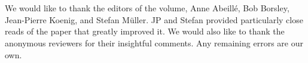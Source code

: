\section*{\acknowledgmentsUS}

We would like to thank the editors of the volume, Anne Abeillé, Bob Borsley, Jean-Pierre Koenig, and Stefan Müller. JP and Stefan provided particularly close reads of the paper that greatly improved it. We would also like to thank the anonymous reviewers for their insightful comments. Any remaining errors are our own. 

{\sloppy
\printbibliography[heading=subbibliography,notkeyword=this] 
}
%
%
\let\upashtmp\up




